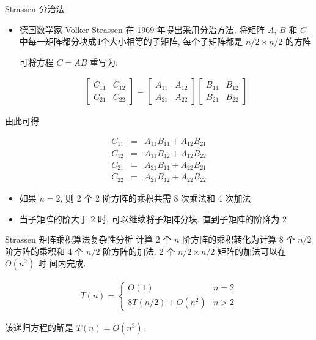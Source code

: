 \documentclass[fontset=fandol,UTF8,fleqn]{beamer}
\begin{document}
\begin{frame}{Strassen 分治法}
\begin{itemize}[<+-|alert@+>]
\item 德国数学家 Volker Strassen 在
 1969 年提出采用分治方法, 将矩阵 $A$, $B$ 和 $C$ 中每一矩阵都分块成4个大小相等的子矩阵, 每个子矩阵都是 $n/2\times n/2$ 的方阵  

 可将方程 $C=AB$ 重写为:  
 \begin{exampleblock}{}   
\begin{eqnarray*}
  \left[\begin{array}{cc}
C_{11} & C_{12} \\
C_{21} & C_{22}
\end{array} \right]= \left[\begin{array}{cc}
A_{11} & A_{12} \\
A_{21} & A_{22}
\end{array} \right]  \left[\begin{array}{cc}
B_{11} & B_{12} \\
B_{21} & B_{22}
\end{array} \right] 
\end{eqnarray*}
\end{exampleblock}
\end{itemize}
\end{frame}

\begin{frame}{}
  由此可得
  \begin{exampleblock}{}
    \begin{eqnarray*}
  C_{11} & = & A_{11}B_{11}+A_{12}B_{21}\\
  C_{12} & = & A_{11}B_{12}+A_{12}B_{22}\\
  C_{21} & = & A_{21}B_{11}+A_{22}B_{21}\\
  C_{22} & = & A_{21}B_{12}+A_{22}B_{22} 
    \end{eqnarray*}
  \end{exampleblock}
  \begin{itemize}[<+-|alert@+>]
\item 如果 $n=2$, 则 2 个 2 阶方阵的乘积共需 8 次乘法和 4 次加法  
\item 当子矩阵的阶大于 2 时, 可以继续将子矩阵分块, 直到子矩阵的阶降为 2  
\end{itemize}
\end{frame}

\begin{frame}{Strassen 矩阵乘积算法复杂性分析}
计算 2 个 $n$ 阶方阵的乘积转化为计算 8 个 $n/2$ 阶方阵的乘积和 4 个
$n/2$ 阶方阵的加法. 2 个 $n/2\times n/2$ 矩阵的加法可以在 $O(n^2)$ 时
间内完成.  
\begin{exampleblock}{}
  \begin{eqnarray*}
  T(n)=\left\{\begin{array}{ll}
O(1) & n=2   \\
8T(n/2)+O(n^2) & n > 2  
\end{array} \right. 
\end{eqnarray*}
\end{exampleblock}
该递归方程的解是 $T(n)=O(n^3)$. 
\end{frame}
\end{document}
